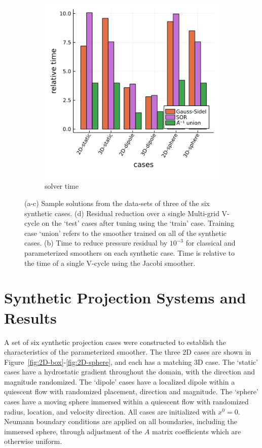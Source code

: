 \documentclass[review]{elsarticle}
\begin{document}
\begin{figure}
\begin{subfigure}[b]{0.47\textwidth}
        \includegraphics[width=\textwidth]{figures/synthetic_timing.png}
        \caption{solver time}
        \label{fig:synthetic time}
    \end{subfigure}
    \caption{(a-c) Sample solutions from the data-sets of three of the six synthetic cases. (d) Residual reduction over a single Multi-grid V-cycle on the `test' cases after tuning using the `train' case. Training case `union' refers to the smoother trained on all of the synthetic cases. (b) Time to reduce pressure residual by $10^{-3}$ for classical and parameterized smoothers on each synthetic case. Time is relative to the time of a single V-cycle using the Jacobi smoother.}
    \label{fig:synthetic cases}
\end{figure}

\section{Synthetic Projection Systems and Results}

A set of six synthetic projection cases were constructed to establish the characteristics of the parameterized smoother. The three 2D cases are shown in Figure~\ref{fig:2D-box}-\ref{fig:2D-sphere}, and each has a matching 3D case. The `static' cases have a hydrostatic gradient throughout the domain, with the direction and magnitude randomized. The `dipole' cases have a localized dipole within a quiescent flow with randomized placement, direction and magnitude. The `sphere' cases have a moving sphere immersed within a quiescent flow with randomized radius, location, and velocity direction. All cases are initialized with $x^0=0$.
Neumann boundary conditions are applied on all boundaries, including the immersed sphere, through adjustment of the $A$ matrix coefficients which are otherwise uniform. 
\end{document}
